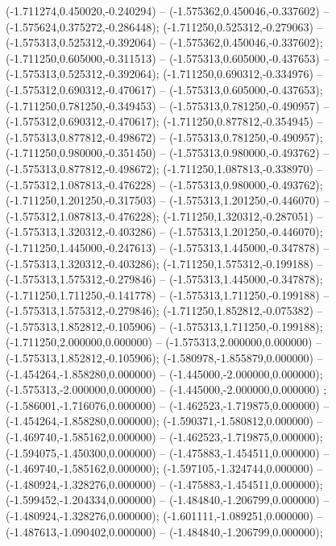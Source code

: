  (-1.711274,0.450020,-0.240294) -- (-1.575362,0.450046,-0.337602) -- (-1.575624,0.375272,-0.286448);
 (-1.711250,0.525312,-0.279063) -- (-1.575313,0.525312,-0.392064) -- (-1.575362,0.450046,-0.337602);
 (-1.711250,0.605000,-0.311513) -- (-1.575313,0.605000,-0.437653) -- (-1.575313,0.525312,-0.392064);
 (-1.711250,0.690312,-0.334976) -- (-1.575312,0.690312,-0.470617) -- (-1.575313,0.605000,-0.437653);
 (-1.711250,0.781250,-0.349453) -- (-1.575313,0.781250,-0.490957) -- (-1.575312,0.690312,-0.470617);
 (-1.711250,0.877812,-0.354945) -- (-1.575313,0.877812,-0.498672) -- (-1.575313,0.781250,-0.490957);
 (-1.711250,0.980000,-0.351450) -- (-1.575313,0.980000,-0.493762) -- (-1.575313,0.877812,-0.498672);
 (-1.711250,1.087813,-0.338970) -- (-1.575312,1.087813,-0.476228) -- (-1.575313,0.980000,-0.493762);
 (-1.711250,1.201250,-0.317503) -- (-1.575313,1.201250,-0.446070) -- (-1.575312,1.087813,-0.476228);
 (-1.711250,1.320312,-0.287051) -- (-1.575313,1.320312,-0.403286) -- (-1.575313,1.201250,-0.446070);
 (-1.711250,1.445000,-0.247613) -- (-1.575313,1.445000,-0.347878) -- (-1.575313,1.320312,-0.403286);
 (-1.711250,1.575312,-0.199188) -- (-1.575313,1.575312,-0.279846) -- (-1.575313,1.445000,-0.347878);
 (-1.711250,1.711250,-0.141778) -- (-1.575313,1.711250,-0.199188) -- (-1.575313,1.575312,-0.279846);
 (-1.711250,1.852812,-0.075382) -- (-1.575313,1.852812,-0.105906) -- (-1.575313,1.711250,-0.199188);
 (-1.711250,2.000000,0.000000) -- (-1.575313,2.000000,0.000000) -- (-1.575313,1.852812,-0.105906);
 (-1.580978,-1.855879,0.000000) -- (-1.454264,-1.858280,0.000000) -- (-1.445000,-2.000000,0.000000);
 (-1.575313,-2.000000,0.000000) -- (-1.445000,-2.000000,0.000000) ;
 (-1.586001,-1.716076,0.000000) -- (-1.462523,-1.719875,0.000000) -- (-1.454264,-1.858280,0.000000);
 (-1.590371,-1.580812,0.000000) -- (-1.469740,-1.585162,0.000000) -- (-1.462523,-1.719875,0.000000);
 (-1.594075,-1.450300,0.000000) -- (-1.475883,-1.454511,0.000000) -- (-1.469740,-1.585162,0.000000);
 (-1.597105,-1.324744,0.000000) -- (-1.480924,-1.328276,0.000000) -- (-1.475883,-1.454511,0.000000);
 (-1.599452,-1.204334,0.000000) -- (-1.484840,-1.206799,0.000000) -- (-1.480924,-1.328276,0.000000);
 (-1.601111,-1.089251,0.000000) -- (-1.487613,-1.090402,0.000000) -- (-1.484840,-1.206799,0.000000);
